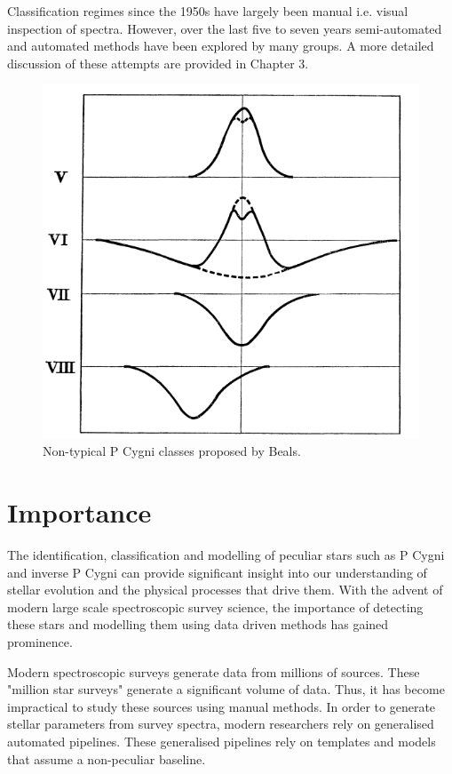Classification regimes since the 1950s have largely been manual i.e. visual inspection of spectra. However, over the last five to seven years semi-automated and automated methods have been explored by many groups. A more detailed discussion of these attempts are provided in Chapter 3.

\begin{figure}[h]
\centering
\includegraphics[scale=.50]{figures/beals class 2.png}
\caption{Non-typical P Cygni classes proposed by Beals.}
\end{figure}

\section{Importance}

The identification, classification and modelling of peculiar stars such as P Cygni and inverse P Cygni can provide significant insight into our understanding of stellar evolution and the physical processes that drive them. With the advent of modern large scale spectroscopic survey science, the importance of detecting these stars and modelling them using data driven methods has gained prominence.

Modern spectroscopic surveys generate data from millions of sources. These "million star surveys" generate a significant volume of data. Thus, it has become impractical to study these sources using manual methods. In order to generate stellar parameters from survey spectra, modern researchers rely on generalised automated pipelines. These generalised pipelines rely on templates and models that assume a non-peculiar baseline. 

